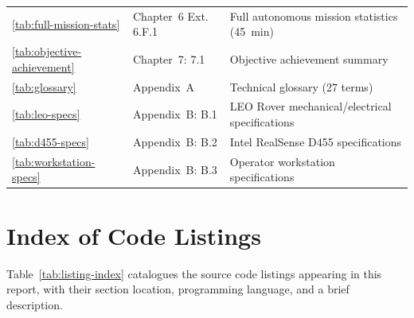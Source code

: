 \begin{longtable}{@{}L{2.2cm}L{3.6cm}L{7.4cm}@{}}
\ref{tab:full-mission-stats} & Chapter~6 Ext.\: 6.F.1 & Full autonomous mission statistics (45~min) \\
\ref{tab:objective-achievement} & Chapter~7: 7.1 & Objective achievement summary \\
\ref{tab:glossary} & Appendix~A & Technical glossary (27 terms) \\
\ref{tab:leo-specs} & Appendix~B: B.1 & LEO Rover mechanical/electrical specifications \\
\ref{tab:d455-specs} & Appendix~B: B.2 & Intel RealSense D455 specifications \\
\ref{tab:workstation-specs} & Appendix~B: B.3 & Operator workstation specifications \\
\bottomrule
\end{longtable}
\endgroup

\section{Index of Code Listings}

Table~\ref{tab:listing-index} catalogues the source code listings appearing in this report, with their section location, programming language, and a brief description.

